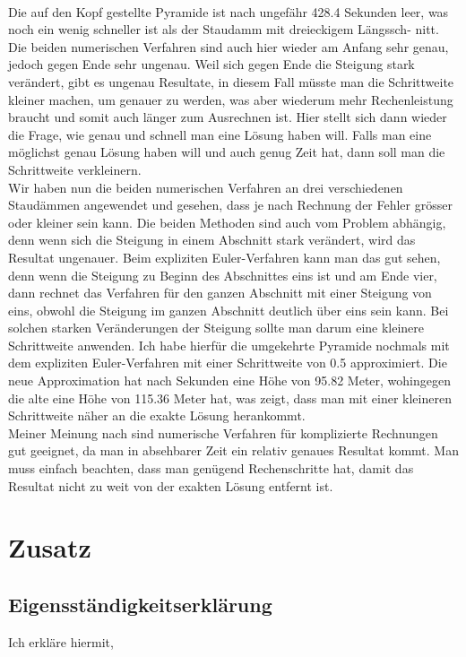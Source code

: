 \documentclass[a4paper,12pt]{report}
\begin{document}
\noindent
\\Die auf den Kopf gestellte Pyramide ist nach ungefähr 428.4 Sekunden leer, was noch ein wenig schneller ist als der Staudamm mit dreieckigem Längssch- nitt. Die beiden numerischen Verfahren sind auch hier wieder am Anfang sehr genau, jedoch gegen Ende sehr ungenau. Weil sich gegen Ende die Steigung stark verändert, gibt es ungenau Resultate, in diesem Fall müsste man die Schrittweite kleiner machen, um genauer zu werden, was aber wiederum mehr Rechenleistung braucht und somit auch länger zum Ausrechnen ist. Hier stellt sich dann wieder die Frage, wie genau und schnell man eine Lösung haben will. Falls man eine möglichst genau Lösung haben will und auch genug Zeit hat, dann soll man die Schrittweite verkleinern.\\

\noindent
Wir haben nun die beiden numerischen Verfahren an drei verschiedenen Staudämmen angewendet und gesehen, dass je nach Rechnung der Fehler grösser oder kleiner sein kann. Die beiden Methoden sind auch vom Problem abhängig, denn wenn sich die Steigung in einem Abschnitt stark verändert, wird das Resultat ungenauer. Beim expliziten Euler-Verfahren kann man das gut sehen, denn wenn die Steigung zu Beginn des Abschnittes eins ist und am Ende vier, dann rechnet das Verfahren für den ganzen Abschnitt mit einer Steigung von eins, obwohl die Steigung im ganzen Abschnitt deutlich über eins sein kann. Bei solchen starken Veränderungen der Steigung sollte man darum eine kleinere Schrittweite anwenden. Ich habe hierfür die umgekehrte Pyramide nochmals mit dem expliziten Euler-Verfahren mit einer Schrittweite von 0.5 approximiert. Die neue Approximation hat nach Sekunden eine Höhe von 95.82 Meter, wohingegen die alte eine Höhe von 115.36 Meter hat, was zeigt, dass man mit einer kleineren Schrittweite näher an die exakte Lösung herankommt. \\

\noindent 
Meiner Meinung nach sind numerische Verfahren für komplizierte Rechnungen gut geeignet, da man in absehbarer Zeit ein relativ genaues Resultat kommt. Man muss einfach beachten, dass man genügend Rechenschritte hat, damit das Resultat nicht zu weit von der exakten Lösung entfernt ist. 

\chapter{Zusatz}
\section{Eigensständigkeitserklärung}
Ich erkläre hiermit, \\
\end{document}
